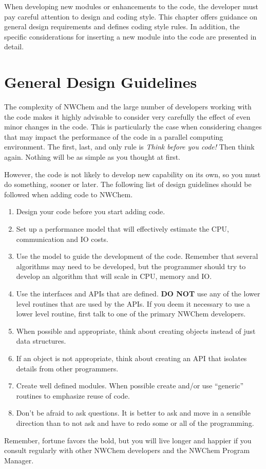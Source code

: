 \label{sec:develop}

When developing new modules or enhancements to the code, the developer must
pay careful attention to design and coding style.  This chapter offers
guidance on general design requirements and defines coding style rules.
In addition, the specific considerations for inserting a new module
into the code are presented in detail.

\section{General Design Guidelines}
\label{sec:gendesign}

The complexity of NWChem and the large number of developers working with the
code makes it highly advisable to consider very carefully the effect of even
minor changes in the code.  This is particularly the case when considering
changes that may impact the performance of the code in a parallel computing 
environment.  The first, last, and only rule is {\em Think before you code!}
Then think again.  Nothing will be as simple as you thought at first.

However, the code is not likely to develop new capability on its own, so you
must do something, sooner or later.  The following list of design guidelines
should be followed when adding code to NWChem.

\begin{enumerate}
\item Design your code before you start adding code.
\item Set up a performance model that will effectively estimate the
CPU, communication and IO costs.
\item Use the model to guide the development of the code.  Remember
that several algorithms may need to be developed, but the programmer
should try to develop an algorithm that will scale in CPU, memory and
IO.
\item Use the interfaces and APIs that are defined.  {\bf DO NOT}
use any of the lower level routines that are used by the APIs.  If
you deem it necessary to use a lower level routine, first talk to
one of the primary NWChem developers.
\item When possible and appropriate, think about creating objects
instead of just data structures.
\item If an object is not appropriate, think about creating an API
that isolates details from other programmers.
\item Create well defined modules.  When possible create and/or
use ``generic'' routines to emphasize reuse of code.
\item Don't be afraid to ask questions.  It is better to ask and
move in a sensible direction than to not ask and have to redo some
or all of the programming.
\end{enumerate}

Remember, fortune favors the bold, but you will live longer and happier if you
consult regularly with other NWChem developers and the NWChem Program
Manager.
